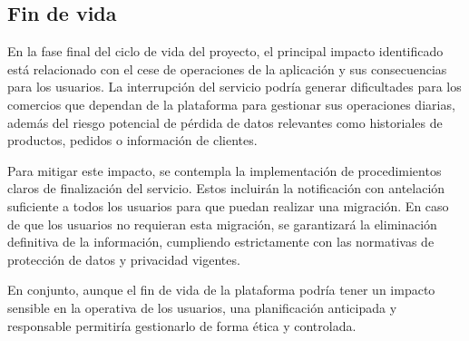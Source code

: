 \subsection{Fin de vida}

En la fase final del ciclo de vida del proyecto, el principal impacto identificado está relacionado con el cese de operaciones de la aplicación y sus consecuencias para los usuarios. La interrupción del servicio podría generar dificultades para los comercios que dependan de la plataforma para gestionar sus operaciones diarias, además del riesgo potencial de pérdida de datos relevantes como historiales de productos, pedidos o información de clientes.

Para mitigar este impacto, se contempla la implementación de procedimientos claros de finalización del servicio. Estos incluirán la notificación con antelación suficiente a todos los usuarios para que puedan realizar una migración. En caso de que los usuarios no requieran esta migración, se garantizará la eliminación definitiva de la información, cumpliendo estrictamente con las normativas de protección de datos y privacidad vigentes.

En conjunto, aunque el fin de vida de la plataforma podría tener un impacto sensible en la operativa de los usuarios, una planificación anticipada y responsable permitiría gestionarlo de forma ética y controlada.
